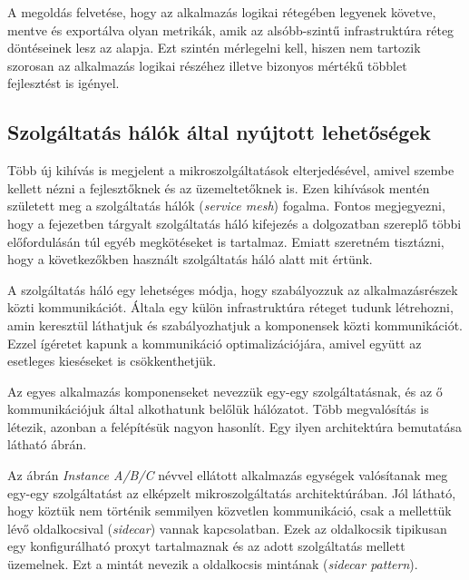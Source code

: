 A megoldás felvetése, hogy az alkalmazás logikai rétegében legyenek követve, mentve és exportálva olyan metrikák, amik az alsóbb-szintű infrastruktúra réteg döntéseinek lesz az alapja.
Ezt szintén mérlegelni kell, hiszen nem tartozik szorosan az alkalmazás logikai részéhez illetve bizonyos mértékű többlet fejlesztést is igényel.

\subsection{Szolgáltatás hálók által nyújtott lehetőségek}
Több új kihívás is megjelent a mikroszolgáltatások elterjedésével, amivel szembe kellett nézni a fejlesztőknek és az üzemeltetőknek is.
Ezen kihívások mentén született meg a szolgáltatás hálók (\textit{service mesh}) fogalma. 
Fontos megjegyezni, hogy a fejezetben tárgyalt szolgáltatás háló kifejezés a dolgozatban szereplő többi előfordulásán túl egyéb megkötéseket is tartalmaz.
Emiatt szeretném tisztázni, hogy a következőkben használt szolgáltatás háló alatt mit értünk.

A szolgáltatás háló egy lehetséges módja, hogy szabályozzuk az alkalmazásrészek közti kommunikációt. 
Általa egy külön infrastruktúra réteget tudunk létrehozni, amin keresztül láthatjuk és szabályozhatjuk a komponensek közti kommunikációt.
Ezzel ígéretet kapunk a kommunikáció optimalizációjára, amivel együtt az esetleges kieséseket is csökkenthetjük\citep{serviceMeshDefinition}.

Az egyes alkalmazás komponenseket nevezzük egy-egy szolgáltatásnak, és az ő kommunikációjuk által alkothatunk belőlük hálózatot.
Több megvalósítás is létezik, azonban a felépítésük nagyon hasonlít.
Egy ilyen architektúra bemutatása látható  ábrán.

Az ábrán \textit{Instance A/B/C} névvel ellátott alkalmazás egységek valósítanak meg egy-egy szolgáltatást az elképzelt mikroszolgáltatás architektúrában. 
Jól látható, hogy köztük nem történik semmilyen közvetlen kommunikáció, csak a mellettük lévő oldalkocsival (\textit{sidecar}) vannak kapcsolatban.
Ezek az oldalkocsik tipikusan egy konfigurálható proxyt tartalmaznak és az adott szolgáltatás mellett üzemelnek.
Ezt a mintát nevezik a oldalkocsis mintának (\textit{sidecar pattern})\citep{sidecarPattern}.



